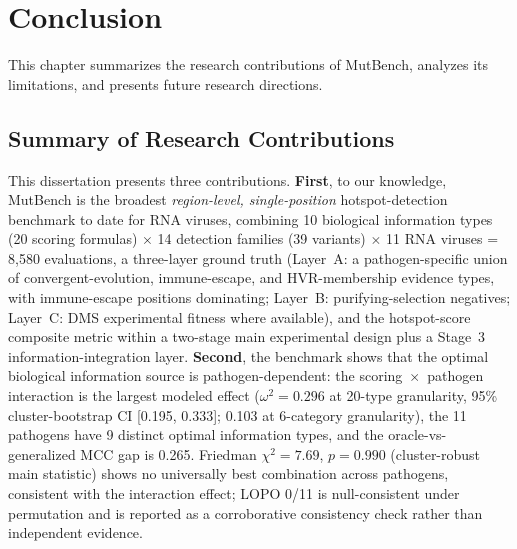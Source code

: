 \chapter{Conclusion}
\label{ch:conclusion}

This chapter summarizes the research contributions of MutBench, analyzes its limitations, and presents future research directions.

\section{Summary of Research Contributions}
\label{sec:contribution_summary}

This dissertation presents three contributions.
\textbf{First}, to our knowledge, MutBench is the broadest \emph{region-level, single-position} hotspot-detection benchmark to date for RNA viruses, combining 10 biological information types (20 scoring formulas) $\times$ 14 detection families (39 variants) $\times$ 11 RNA viruses = 8{,}580 evaluations, a three-layer ground truth (Layer~A: a pathogen-specific union of convergent-evolution, immune-escape, and HVR-membership evidence types, with immune-escape positions dominating; Layer~B: purifying-selection negatives; Layer~C: DMS experimental fitness where available), and the hotspot-score composite metric within a two-stage main experimental design plus a Stage~3 information-integration layer.
\textbf{Second}, the benchmark shows that the optimal biological information source is pathogen-dependent: the scoring~$\times$~pathogen interaction is the largest modeled effect ($\omega^2=0.296$ at 20-type granularity, 95\% cluster-bootstrap CI [0.195, 0.333]; 0.103 at 6-category granularity), the 11 pathogens have 9 distinct optimal information types, and the oracle-vs-generalized MCC gap is 0.265.
Friedman $\chi^2=7.69$, $p=0.990$ (cluster-robust main statistic) shows no universally best combination across pathogens, consistent with the interaction effect; LOPO 0/11 is null-consistent under permutation and is reported as a corroborative consistency check rather than independent evidence.
